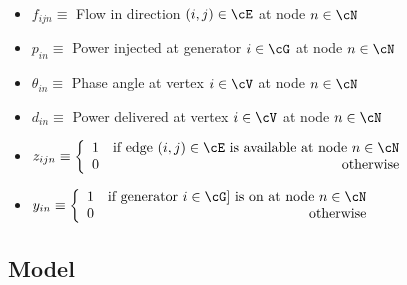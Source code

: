 \begin{itemize}
\item $f_{ijn} \equiv $ Flow in direction $(i,j) \in \cE$ at node $ n \in \cN $
\item $p_{in} \equiv $ Power injected at generator $i \in \cG$ at node $n \in \cN$
\item $\theta_{in} \equiv $ Phase angle at vertex $i \in \cV$ at node $n \in \cN$
\item $d_{in} \equiv $ Power delivered at vertex $i \in \cV$ at node $n \in \cN$
\item $z_{ijn} \equiv  
	\left\{ 
	\begin{array}{lr}
			1 & \mbox{if edge } (i,j) \in \cE \mbox{ is available at node } n \in \cN\\
			 0 & \mbox{otherwise}
	\end{array}
	\right.$
\item $y_{in} \equiv  
	\left\{ 
	\begin{array}{lr}
			1 & \mbox{if generator } i \in \cG] \mbox{ is on at node } n \in \cN\\
			 0 & \mbox{otherwise}
	\end{array}
	\right.$
\end{itemize}


\subsection{Model}


